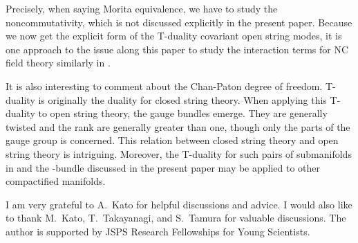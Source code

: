 \documentclass[a4paper,12pt]{article}
\providecommand{\T}{{\mathbb{T}}}
\begin{document}
Precisely, when saying Morita equivalence, 
we have to study the noncommutativity, which is not discussed 
explicitly in the present paper. 
Because we now get the explicit form of 
the T-duality covariant open string modes, 
it is one approach to the issue along this paper 
to study the interaction terms 
for NC field theory similarly in \cite{KO,CK}. 

It is also interesting to comment about the Chan-Paton degree of freedom. 
T-duality is originally the duality for closed string theory. 
When applying this T-duality to open string theory, the gauge bundles 
emerge. 
They are generally twisted and the rank are generally greater than one, 
though only the \coordHE{} parts of the gauge group is concerned. 
This relation between closed string theory and open string theory is 
intriguing. Moreover, 
the T-duality for such pairs of submanifolds in \myHighlight{$\T^d$}\coordHE{} 
and the \coordHE{}-bundle discussed in the present paper 
may be applied to other compactified manifolds. 
 







\begin{center}
\end{center}

I am very grateful to A.~Kato for helpful discussions and advice.
I would also like to thank M.~Kato, T.~Takayanagi, and S.~Tamura 
for valuable discussions.
The author is  supported by JSPS Research Fellowships for Young
Scientists. 
\end{document}

